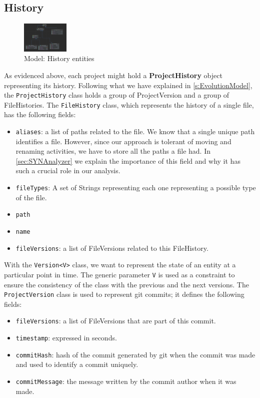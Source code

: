 \subsection*{History}

\begin{figure}
    \center
    \includegraphics[width=0.2\textwidth]{UMLHistory.png}
    \caption{Model: History entities}
    \label{fig:modelHistory}
\end{figure}

As evidenced above, each project might hold a \textbf{ProjectHistory} object representing its history. 
Following what we have explained in \autoref{s:EvolutionModel}, the \texttt{ProjectHistory} class holds a group of ProjectVersion and a group of FileHistories. The \texttt{FileHistory} class, which represents the history of a single file, has the following fields:
\begin{itemize}
    \item \texttt{aliases}: a list of paths related to the file. We know that a single unique path identifies a file. However, since our approach is tolerant of moving and renaming activities, we have to store all the paths a file had. In \autoref{sec:SYNAnalyzer} we explain the importance of this field and why it has such a crucial role in our analysis. 
    \item \texttt{fileTypes}: A set of Strings representing each one representing a possible type of the file. 
    \item \texttt{path}
    \item \texttt{name}
    \item \texttt{fileVersions}: a list of FileVersions related to this FileHistory. 
\end{itemize}
With the \texttt{Version<V>} class, we want to represent the state of an entity at a particular point in time. 
The generic parameter \texttt{V} is used as a constraint to ensure the consistency of the class with the previous and the next versions. 
The \texttt{ProjectVersion} class is used to represent git commits; it defines the following fields: 
\begin{itemize}
    \item \texttt{fileVersions}: a list of FileVersions that are part of this commit.
    \item \texttt{timestamp}: expressed in seconds. 
    \item \texttt{commitHash}: hash of the commit generated by git when the commit was made and used to identify a commit uniquely. 
    \item \texttt{commitMessage}: the message written by the commit author when it was made. 
\end{itemize}

